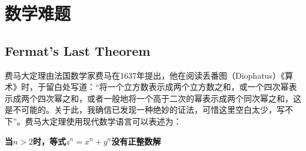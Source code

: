 %
%
%
%
%
%

\section{数学难题}
\subsection{Fermat's Last Theorem}
费马大定理由法国数学家费马在1637年提出，他在阅读丢番图（Diophatus）《算术》时，于留白处写道：“将一个立方数表示成两个立方数之和，或一个四次幂表示成两个四次幂之和，或者一般地将一个高于二次的幂表示成两个同次幂之和，这是不可能的。关于此，我确信已发现一种绝妙的证法，可惜这里空白太少，写不下”。费马大定理使用现代数学语言可以表述为：\\
\centerline{\textbf{当$n>2$时，等式$z^n=x^n + y^n$没有正整数解}}

